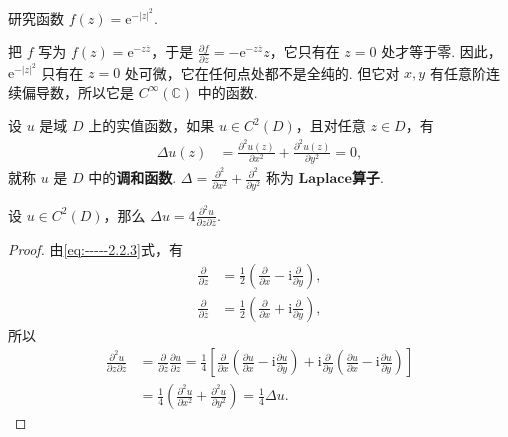 \documentclass[../../main.tex]{subfiles}
\begin{document}
\begin{example}
研究函数 $f(z) = \mathrm{e}^{-\vert z \vert^2}$.
\end{example}
\begin{solution}
把 $f$ 写为 $f(z) = \mathrm{e}^{-z\overline{z}}$，于是 $\frac{\partial f}{\partial \overline{z}} = -\mathrm{e}^{-z\overline{z}}z$，它只有在 $z = 0$ 处才等于零. 因此，$\mathrm{e}^{-\vert z \vert^2}$ 只有在 $z = 0$ 处可微，它在任何点处都不是全纯的. 但它对 $x, y$ 有任意阶连续偏导数，所以它是 $C^\infty(\mathbb{C})$ 中的函数.
\end{solution}

\begin{definition}[调和函数]
设 $u$ 是域 $D$ 上的实值函数，如果 $u \in C^2(D)$，且对任意 $z \in D$，有
\begin{align}
\Delta u(z) &= \frac{\partial^2 u(z)}{\partial x^2} + \frac{\partial^2 u(z)}{\partial y^2} = 0, \label{eq:2.2.7}
\end{align}
就称 $u$ 是 $D$ 中的\textbf{调和函数}. $\Delta = \frac{\partial^2}{\partial x^2} + \frac{\partial^2}{\partial y^2}$ 称为 $\mathbf{Laplace}$\textbf{算子}.
\end{definition}

\begin{proposition}
设 $u \in C^2(D)$，那么 $\Delta u = 4 \frac{\partial^2 u}{\partial z \partial \overline{z}}$.
\end{proposition}
\begin{proof}
由\eqref{eq:-----2.2.3}式，有
\begin{align*}
\frac{\partial}{\partial z} &= \frac{1}{2}\left( \frac{\partial}{\partial x} - \text{i}\frac{\partial}{\partial y} \right), \\
\frac{\partial}{\partial \overline{z}} &= \frac{1}{2}\left( \frac{\partial}{\partial x} + \text{i}\frac{\partial}{\partial y} \right),
\end{align*}
所以
\begin{align*}
\frac{\partial^2 u}{\partial z \partial \overline{z}} &= \frac{\partial}{\partial \overline{z}} \frac{\partial u}{\partial z} = \frac{1}{4} \left[ \frac{\partial}{\partial x} \left( \frac{\partial u}{\partial x} - \mathrm{i} \frac{\partial u}{\partial y} \right) + \mathrm{i} \frac{\partial}{\partial y} \left( \frac{\partial u}{\partial x} - \mathrm{i} \frac{\partial u}{\partial y} \right) \right] \\
&= \frac{1}{4} \left( \frac{\partial^2 u}{\partial x^2} + \frac{\partial^2 u}{\partial y^2} \right) = \frac{1}{4} \Delta u.
\end{align*}
\end{proof}
\end{document}
